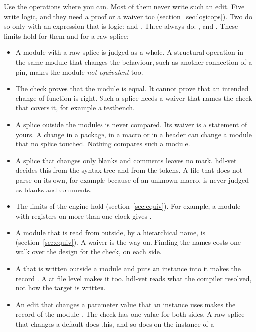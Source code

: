 \begin{itemize}
  Use the operations where you can. Most of them never write such an edit. Five write
  logic, and they need a proof or a waiver too (section~\ref{sec:logicops}). Two do so
  only with an expression that is logic:  and
  . Three always do: ,
   and . These limits hold for
  them and for a raw splice:
  \begin{itemize}
  \item A module with a raw splice is judged as a whole. A structural operation in the same
    module that changes the behaviour, such as another connection of a pin, makes the
    module \emph{not equivalent} too.
  \item The check proves that the module is equal. It cannot prove that an intended change
    of function is right. Such a splice needs a waiver that names the check that covers it,
    for example a testbench.
  \item A splice outside the modules is never compared. Its waiver is a statement of
    yours. A change in a package, in a macro or in a header can change a module that no
    splice touched. Nothing compares such a module.
  \item A splice that changes only blanks and comments leaves no mark. hdl-vet decides this
    from the syntax tree and from the tokens. A file that does not parse on its own, for
    example because of an unknown macro, is never judged as blanks and comments.
  \item The limits of the engine hold (section~\ref{sec:equiv}). For example, a module
    with registers on more than one clock gives .
  \item A module that is read from outside, by a hierarchical name, is 
    (section~\ref{sec:equiv}). A waiver is the way on. Finding the names costs one walk
    over the design for the check, on each side.
  \item A  that is written outside a module and puts an instance into it makes
    the record . A  at file level makes it  too. hdl-vet
    reads what the compiler resolved, not how the target is written.
  \item An edit that changes a parameter value that an instance uses makes the record of
    the module . The check has one value for both sides. A raw splice that
    changes a default does this, and so does  on the instance of a

\end{itemize}
\end{itemize}
